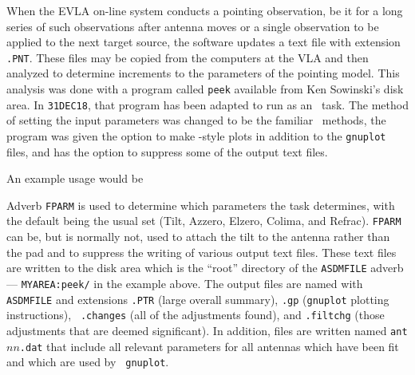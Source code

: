 When the EVLA on-line system conducts a pointing observation, be it
for a long series of such observations after antenna moves or a
single observation to be applied to the next target source, the
software updates a text file with extension {\tt .PNT}\@.  These files
may be copied from the computers at the VLA and then analyzed to
determine increments to the parameters of the pointing model.  This
analysis was done with a program called {\tt peek} available from Ken
Sowinski's disk area.  In {\tt 31DEC18}, that program has been adapted
to run as an \AIPS\ task.  The method of setting the input parameters
was changed to be the familiar \AIPS\ methods, the program was given
the option to make \AIPS-style plots in addition to the {\tt gnuplot}
files, and has the option to suppress some of the output text files.

An example usage would be

Adverb {\tt FPARM} is used to determine which parameters the task
determines, with the default being the usual set (Tilt, Azzero, Elzero,
Colima, and Refrac).  {\tt FPARM} can be, but is normally not, used to
attach the tilt to the antenna rather than the pad and to suppress the
writing of various output text files.  These text files are written to
the disk area which is the ``root'' directory of the {\tt ASDMFILE}
adverb --- {\tt MYAREA:peek/} in the example above.  The output files
are named with {\tt ASDMFILE} and extensions {\tt .PTR} (large overall
summary), {\tt .gp} ({\tt gnuplot} plotting instructions), {\tt
.changes} (all of the adjustments found), and {\tt .filtchg} (those
adjustments that are deemed significant).  In addition, files are
written named {\tt ant$nn$.dat} that include all relevant parameters
for all antennas which have been fit and which are used by {\tt
gnuplot}.

